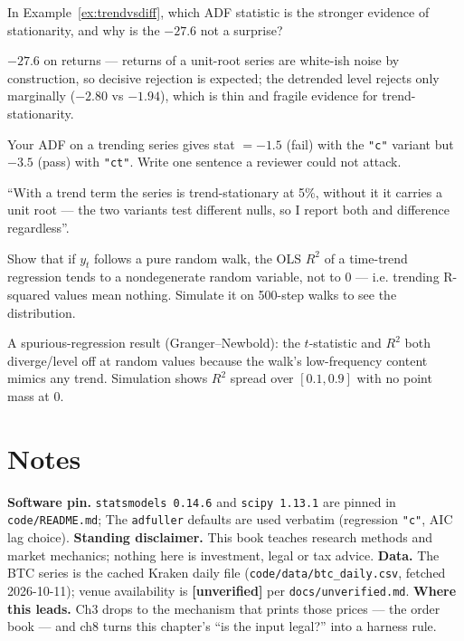 \begin{exercise}[easy]
In Example~\ref{ex:trendvsdiff}, which ADF statistic is the
stronger evidence of stationarity, and why is the $-27.6$ not a
surprise?
\end{exercise}
\begin{solution}
$-27.6$ on returns --- returns of a unit-root series are white-ish
noise by construction, so decisive rejection is expected; the
detrended level rejects only marginally ($-2.80$ vs $-1.94$), which
is thin and fragile evidence for trend-stationarity.
\end{solution}
\begin{exercise}[medium]
Your ADF on a trending series gives stat $=-1.5$ (fail) with the
\texttt{"c"} variant but $-3.5$ (pass) with \texttt{"ct"}.
Write one sentence a reviewer could not attack.
\end{exercise}
\begin{solution}
``With a trend term the series is trend-stationary at 5\%, without
it it carries a unit root --- the two variants test different nulls,
so I report both and difference regardless''.
\end{solution}
\begin{exercise}[hard]
Show that if $y_t$ follows a pure random walk, the OLS $R^2$ of a
time-trend regression tends to a nondegenerate random variable, not
to $0$ --- i.e. trending R-squared values mean nothing. Simulate it
on 500-step walks to see the distribution.
\end{exercise}
\begin{solution}
A spurious-regression result (Granger--Newbold): the $t$-statistic
and $R^2$ both diverge/level off at random values because the
walk's low-frequency content mimics any trend. Simulation shows
$R^2$ spread over $[0.1, 0.9]$ with no point mass at 0.
\end{solution}

\section*{Notes}
\textbf{Software pin.} \texttt{statsmodels 0.14.6} and
\texttt{scipy 1.13.1} are pinned in \texttt{code/README.md};
The \texttt{adfuller} defaults
are used verbatim (regression \texttt{"c"}, AIC lag choice). \textbf{Standing disclaimer.} This book teaches
research methods and market mechanics; nothing here is investment,
legal or tax advice. \textbf{Data.} The BTC series is the cached
Kraken daily file (\texttt{code/data/btc\_daily.csv}, fetched
2026-10-11); venue availability is \textbf{[unverified]} per
\texttt{docs/unverified.md}.
\textbf{Where this leads.} Ch3 drops to the mechanism that prints
those prices --- the order book --- and ch8 turns this chapter's
``is the input legal?'' into a harness rule.

